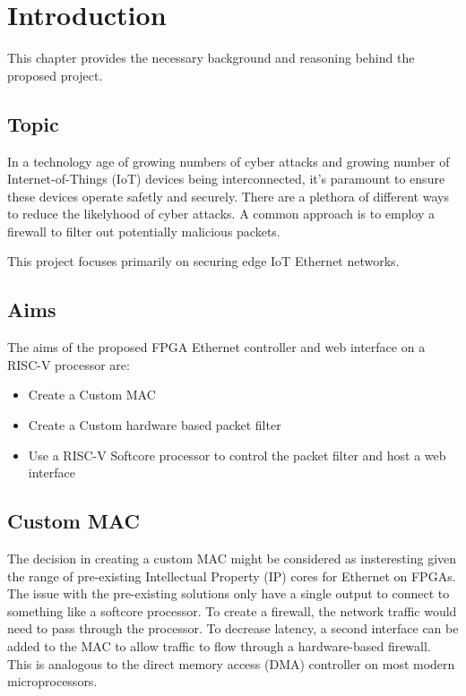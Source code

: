 \chapter[Introduction]{Introduction}
\label{Chap:Intro}




This chapter provides the necessary background and reasoning behind the proposed project. 
\section{Topic}


In a technology age of growing numbers of cyber attacks and growing number of Internet-of-Things (IoT) devices being interconnected, it's 
paramount to ensure these devices operate safetly and securely. There are a plethora of different ways to reduce the likelyhood of cyber attacks.
A common approach is to employ a firewall to filter out potentially malicious packets. 

This project focuses primarily on securing edge IoT Ethernet networks. 


\section{Aims}

The aims of the proposed FPGA Ethernet controller and web interface on a RISC-V processor are:

\begin{itemize}
    \item Create a Custom MAC
    \item Create a Custom hardware based packet filter
    \item Use a RISC-V Softcore processor to control the packet filter and host a web interface
\end{itemize}



\section{Custom MAC}
The decision in creating a custom MAC might be considered as insteresting given the range of pre-existing Intellectual 
Property (IP) cores for Ethernet on FPGAs. The issue with the pre-existing solutions only have a single output to connect to something like a softcore
processor. To create a firewall, the network traffic would need to pass through the processor. To decrease latency, a second interface can be added 
to the MAC to allow traffic to flow through a hardware-based firewall. This is analogous to the direct memory access (DMA) controller on most modern 
microprocessors. 



